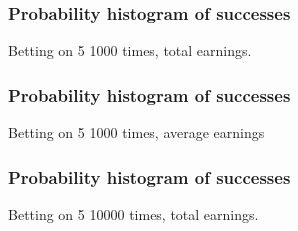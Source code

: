 \documentclass[handout]{beamer}
\begin{document}
   \begin{frame}
   \frametitle{Probability histogram of successes}
   \begin{center}
   \end{center}
   Betting on {\color{red} 5} 1000 times,  total earnings.
   \end{frame}



   \begin{frame}
   \frametitle{Probability histogram of successes}
   \begin{center}
   \end{center}
   Betting on {\color{red} 5} 1000 times, average earnings
   \end{frame}



   \begin{frame}
   \frametitle{Probability histogram of successes}
   \begin{center}
   \end{center}
   Betting on {\color{red} 5} 10000 times, total earnings.
   \end{frame}

\end{document}
